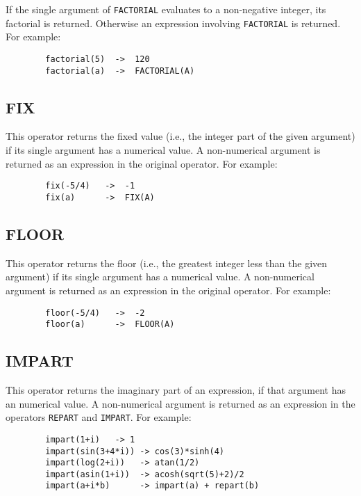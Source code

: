If the single argument of \texttt{FACTORIAL} evaluates to a non-negative
integer, its factorial is returned.  Otherwise an expression involving
\texttt{FACTORIAL} is returned. For example:
\begin{verbatim}
        factorial(5)  ->  120
        factorial(a)  ->  FACTORIAL(A)
\end{verbatim}

\subsection{FIX}
\hypertarget{operator:FIX}{}
This operator returns the fixed value (i.e., the integer part of
the given argument) if its single argument has a numerical value.  A
non-numerical argument is returned as an expression in the original
operator.  For example:

\begin{verbatim}
        fix(-5/4)   ->  -1
        fix(a)      ->  FIX(A)
\end{verbatim}

\subsection{FLOOR}
\hypertarget{operator:FLOOR}{}
This operator returns the floor (i.e., the greatest integer less than
the given argument) if its single argument has a numerical value.  A
non-numerical argument is returned as an expression in the original
operator.  For example:

\begin{verbatim}
        floor(-5/4)   ->  -2
        floor(a)      ->  FLOOR(A)
\end{verbatim}

\subsection{IMPART}
\hypertarget{operator:IMPART}{}
This operator returns the imaginary part of an expression, if that argument
has an numerical value.  A non-numerical argument is returned as an expression
in the operators \texttt{REPART} and \texttt{IMPART}.  For example:
\begin{verbatim}
        impart(1+i)   -> 1
        impart(sin(3+4*i)) -> cos(3)*sinh(4)
        impart(log(2+i))   -> atan(1/2)
        impart(asin(1+i))  -> acosh(sqrt(5)+2)/2
        impart(a+i*b)      -> impart(a) + repart(b)
\end{verbatim}

